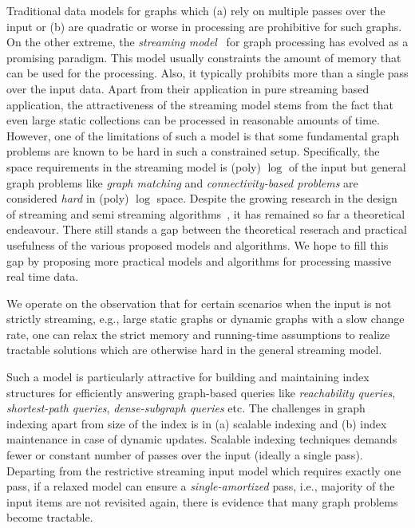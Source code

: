 \documentclass{scrartcl}
\begin{document}
Traditional data models for graphs which (a) rely on multiple passes over the input or (b) are quadratic or worse in processing are prohibitive for such graphs. On the other extreme, the \emph{streaming model}~\cite{Henzinger,Feigenbaum, Alon} for graph processing has evolved as a promising paradigm. This model usually constraints the amount of memory that can be used for the processing. Also, it typically prohibits more than a single pass over the input data. Apart from their application in pure streaming based application, the attractiveness of the streaming model stems from the fact that even large static collections can be processed in reasonable amounts of time. However, one of the limitations of such a model is that some fundamental graph problems are known to be hard in such a constrained setup. Specifically, the space requirements in the streaming model is (poly) $\log$ of the input but general graph problems like \emph{graph matching} and \emph{connectivity-based problems} are considered \emph{hard} in (poly) $\log$ space. Despite the growing research in the design of streaming and semi streaming algorithms~\cite{Henzinger}, it has remained so far a theoretical endeavour. There still stands a gap between the theoretical reserach and practical usefulness of the various proposed models and algorithms. We hope to fill this gap by proposing more practical models and algorithms for processing massive real time data.

We operate on the observation that for certain scenarios when the input is not strictly streaming, e.g., large static graphs or dynamic graphs with a slow change rate, one can relax the strict memory and running-time assumptions to realize tractable solutions which are otherwise hard in the general streaming model.

Such a model is particularly attractive for building and maintaining index structures for efficiently answering graph-based queries like \emph{reachability queries}, \emph{shortest-path queries}, \emph{dense-subgraph queries} etc. The challenges in graph indexing apart from size of the index is in (a) scalable indexing and (b) index maintenance in case of dynamic updates. Scalable indexing techniques demands fewer or constant number of passes over the input (ideally a single pass). Departing from the restrictive streaming input model which requires exactly one pass, if a relaxed model can ensure a \emph{single-amortized} pass, i.e., majority of the input items are not revisited again, there is evidence that many graph problems become tractable. 
\end{document}

